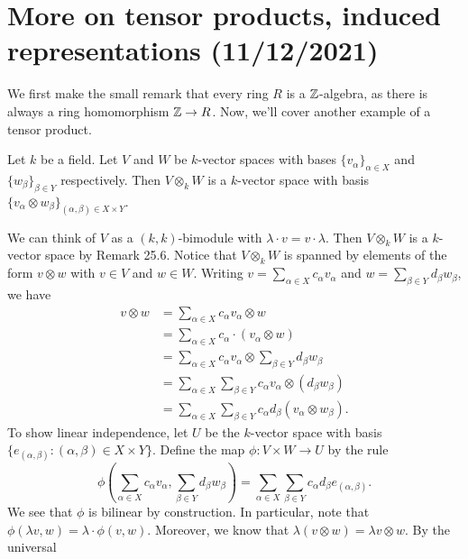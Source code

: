 \section{More on tensor products, induced representations (11/12/2021)}
We first make the small remark that every ring $R$ is a $\mathbb{Z}$-algebra, 
as there is always a ring homomorphism $\mathbb{Z} \to R$. Now, we'll cover 
another example of a tensor product. 

\begin{exmp}{}
    Let $k$ be a field. Let $V$ and $W$ be $k$-vector spaces with bases 
    $\{v_\alpha\}_{\alpha\in X}$ and $\{w_\beta\}_{\beta\in Y}$ respectively. 
    Then $V \otimes_k W$ is a $k$-vector space with basis 
    $\{v_\alpha \otimes w_\beta\}_{(\alpha, \beta) \in X \times Y}$. 
\end{exmp}
\begin{pf}
    We can think of $V$ as a $(k, k)$-bimodule with $\lambda \cdot v = v \cdot \lambda$. 
    Then $V \otimes_k W$ is a $k$-vector space by Remark 25.6. Notice that 
    $V \otimes_k W$ is spanned by elements of the form $v \otimes w$ 
    with $v \in V$ and $w \in W$. Writing $v = \sum_{\alpha\in X} c_\alpha v_\alpha$ 
    and $w = \sum_{\beta\in Y} d_\beta w_\beta$, we have 
    \begin{align*}
        v \otimes w &= \sum_{\alpha \in X} c_\alpha v_\alpha \otimes w \\
        &= \sum_{\alpha \in X} c_\alpha \cdot (v_\alpha \otimes w) \\ 
        &= \sum_{\alpha \in X} c_\alpha v_\alpha \otimes \sum_{\beta \in Y} d_\beta w_\beta \\ 
        &= \sum_{\alpha \in X} \sum_{\beta \in Y} c_\alpha v_\alpha \otimes (d_\beta w_\beta) \\ 
        &= \sum_{\alpha \in X} \sum_{\beta \in Y} c_\alpha d_\beta (v_\alpha \otimes w_\beta). 
    \end{align*}
    To show linear independence, let $U$ be the $k$-vector space with basis
    $\{e_{(\alpha, \beta)} : (\alpha, \beta) \in X \times Y\}$. Define the map 
    $\phi : V \times W \to U$ by the rule 
    \[ \phi \left( \sum_{\alpha \in X} c_\alpha v_\alpha, 
    \sum_{\beta \in Y} d_\beta w_\beta \right) = \sum_{\alpha \in X} 
    \sum_{\beta \in Y} c_\alpha d_\beta e_{(\alpha, \beta)}. \]     
    We see that $\phi$ is bilinear by construction. In particular, 
    note that $\phi(\lambda v, w) = \lambda \cdot \phi(v, w)$. Moreover, 
    we know that $\lambda(v \otimes w) = \lambda v \otimes w$. By the universal 

\end{pf}

